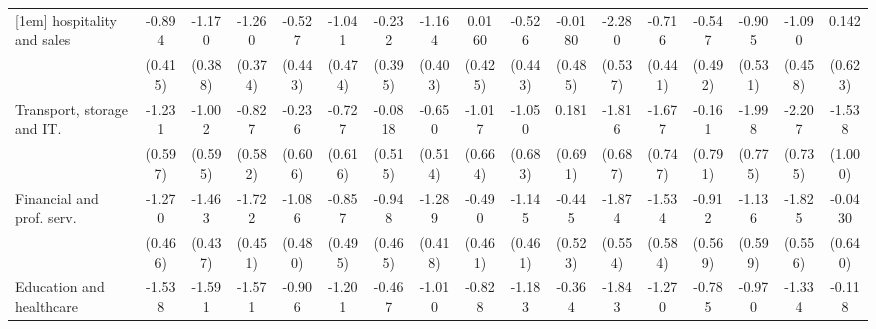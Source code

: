 {\begin{tabular}{l*{16}{c}}
[1em]
hospitality and sales&      -0.894\sym{*}  &      -1.170\sym{**} &      -1.260\sym{***}&      -0.527         &      -1.041\sym{*}  &      -0.232         &      -1.164\sym{**} &      0.0160         &      -0.526         &     -0.0180         &      -2.280\sym{***}&      -0.716         &      -0.547         &      -0.905         &      -1.090\sym{*}  &       0.142         \\
                    &     (0.415)         &     (0.388)         &     (0.374)         &     (0.443)         &     (0.474)         &     (0.395)         &     (0.403)         &     (0.425)         &     (0.443)         &     (0.485)         &     (0.537)         &     (0.441)         &     (0.492)         &     (0.531)         &     (0.458)         &     (0.623)         \\
[1em]
Transport, storage and IT.&      -1.231\sym{*}  &      -1.002         &      -0.827         &      -0.236         &      -0.727         &     -0.0818         &      -0.650         &      -1.017         &      -1.050         &       0.181         &      -1.816\sym{**} &      -1.677\sym{*}  &      -0.161         &      -1.998\sym{**} &      -2.207\sym{**} &      -1.538         \\
                    &     (0.597)         &     (0.595)         &     (0.582)         &     (0.606)         &     (0.616)         &     (0.515)         &     (0.514)         &     (0.664)         &     (0.683)         &     (0.691)         &     (0.687)         &     (0.747)         &     (0.791)         &     (0.775)         &     (0.735)         &     (1.000)         \\
[1em]
Financial and prof. serv.&      -1.270\sym{**} &      -1.463\sym{***}&      -1.722\sym{***}&      -1.086\sym{*}  &      -0.857         &      -0.948\sym{*}  &      -1.289\sym{**} &      -0.490         &      -1.145\sym{*}  &      -0.445         &      -1.874\sym{***}&      -1.534\sym{**} &      -0.912         &      -1.136         &      -1.825\sym{**} &     -0.0430         \\
                    &     (0.466)         &     (0.437)         &     (0.451)         &     (0.480)         &     (0.495)         &     (0.465)         &     (0.418)         &     (0.461)         &     (0.461)         &     (0.523)         &     (0.554)         &     (0.584)         &     (0.569)         &     (0.599)         &     (0.556)         &     (0.640)         \\
[1em]
Education and healthcare&      -1.538\sym{***}&      -1.591\sym{***}&      -1.571\sym{***}&      -0.906\sym{*}  &      -1.201\sym{*}  &      -0.467         &      -1.010\sym{*}  &      -0.828         &      -1.183\sym{*}  &      -0.364         &      -1.843\sym{***}&      -1.270\sym{*}  &      -0.785         &      -0.970         &      -1.334\sym{*}  &      -0.118         \\

\end{tabular}}
